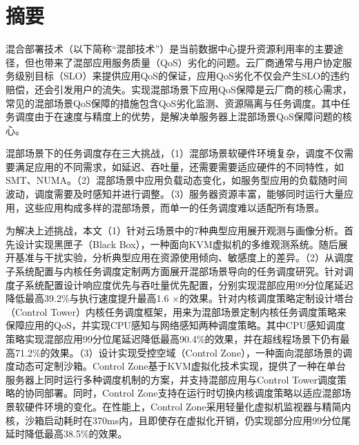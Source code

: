 
\maketitle%
\MAKETITLE%
\makedeclaration%
\intobmk\chapter*{摘\quad 要}%
\setcounter{page}{1}%


混合部署技术（以下简称“混部技术”）是当前数据中心提升资源利用率的主要途径，但也带来了混部应用服务质量（QoS）劣化的问题。云厂商通常与用户协定服务级别目标（SLO）来提供应用QoS的保证，应用QoS劣化不仅会产生SLO的违约赔偿，还会引发用户的流失。实现混部场景下应用QoS保障是云厂商的核心需求，常见的混部场景QoS保障的措施包含QoS劣化监测、资源隔离与任务调度。其中任务调度由于在速度与精度上的优势，是解决单服务器上混部场景QoS保障问题的核心。

混部场景下的任务调度存在三大挑战，（1）混部场景软硬件环境复杂，调度不仅需要满足应用的不同需求，如延迟、吞吐量，还需要需要适应硬件的不同特性，如SMT、NUMA。（2）混部场景中应用负载动态变化，如服务型应用的负载随时间波动，调度需要及时感知并进行调整。（3）服务器资源丰富，能够同时运行大量应用，这些应用构成多样的混部场景，而单一的任务调度难以适配所有场景。

为解决上述挑战，本文（1）针对云场景中的7种典型应用展开观测与画像分析。首先设计实现黑匣子（Black Box），一种面向KVM虚拟机的多维观测系统。随后展开基准与干扰实验，分析典型应用在资源使用倾向、敏感度上的差异。（2）从调度子系统配置与内核任务调度定制两方面展开混部场景导向的任务调度研究。针对调度子系统配置设计响应度优先与吞吐量优先配置，分别实现混部应用99分位尾延迟降低最高39.2\%与执行速度提升最高1.6 $\times$的效果。针对内核调度策略定制设计塔台（Control Tower）内核任务调度框架，用来为混部场景定制内核任务调度策略来保障应用的QoS，并实现CPU感知与网络感知两种调度策略。其中CPU感知调度策略实现混部应用99分位尾延迟降低最高90.4\%的效果，并在超线程场景下仍有最高71.2\%的效果。（3）设计实现受控空域（Control Zone），一种面向混部场景的调度动态可定制沙箱。Control Zone基于KVM虚拟化技术实现，提供了一种在单台服务器上同时运行多种调度机制的方案，并支持混部应用与Control Tower调度策略的协同部署。同时，Control Zone支持在运行时切换内核调度策略以适应混部场景软硬件环境的变化。在性能上，Control Zone采用轻量化虚拟机监视器与精简内核，沙箱启动耗时在370ms内，且即使存在虚拟化开销，仍实现部分应用99分位尾延时降低最高38.5\%的效果。

